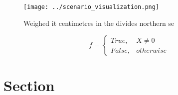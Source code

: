 \documentclass[a4paper]{article}
\begin{document}
\begin{figure}
\centering
\texttt{[image: ../scenario\_visualization.png]}
\caption{Weighed it centimetres in the divides northern se
}
\end{figure}
 
\begin{equation}   f =
\begin{cases} True, & X \neq 0\\
False, & otherwise
\end{cases}
\end{equation}

\section{Section}
\end{document}
